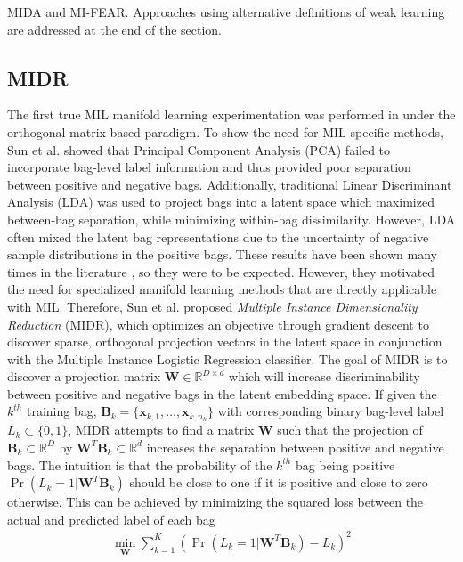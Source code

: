 MIDA and MI-FEAR.  Approaches using alternative definitions of weak learning are addressed at the end of the section.

\subsection{MIDR} \label{sec:MIDR}
The first true MIL manifold learning experimentation was performed in \citep{Sun2010MIDR} under the orthogonal matrix-based paradigm.  To show the need for MIL-specific methods, Sun et al. showed that Principal Component Analysis (PCA) failed to incorporate bag-level label information and thus provided poor separation between positive and negative bags.  Additionally, traditional Linear Discriminant Analysis (LDA) was used to project bags into a latent space which maximized between-bag separation, while minimizing within-bag dissimilarity.  However, LDA often mixed the latent bag representations due to the uncertainty of negative sample distributions in the positive bags.  These results have been shown many times in the literature \citep{Chao2019RecentAdvancesSupervisedDimRed,Vural2018StudySupervisedManifoldLearning}, so they were to be expected.  However, they motivated the need for specialized manifold learning methods that are directly applicable with MIL.  Therefore, Sun et al. proposed \textit{Multiple Instance Dimensionality Reduction} (MIDR), which optimizes an objective through gradient descent to discover sparse, orthogonal projection vectors in the latent space in conjunction with the Multiple Instance Logistic Regression classifier.  The goal of MIDR is to discover a projection matrix $\bm{W} \in \mathbb{R}^{D \times d}$ which will increase discriminability between positive and negative bags in the latent embedding space.  If given the $k^{th}$ training bag, $\bm{B}_{k} = \{ \bm{x}_{k,1}, \dots, \bm{x}_{k,n_{k}} \}$ with corresponding binary bag-level label $L_k \subset \{0,1\}$, MIDR attempts to find a matrix $\bm{W}$ such that the projection of $\bm{B}_{k} \subset \mathbb{R}^{D}$ by $\bm{W}^{T}\bm{B}_{k} \subset \mathbb{R}^{d}$ increases the separation between positive and negative bags. The intuition is that the probability of the $k^{th}$ bag being positive $\Pr(L_{k}=1|\bm{W}^{T}\bm{B}_{k})$ should be close to one if it is positive and close to zero otherwise.  This can be achieved by minimizing the squared loss between the actual and predicted label of each bag
\begin{align}
	\min_{\bm{W}} \sum_{k=1}^{K} (\Pr(L_{k}=1|\bm{W}^{T}\bm{B}_{k}) - L_{k})^{2}
	\label{eq:MIDR_orig_objective}
\end{align}
